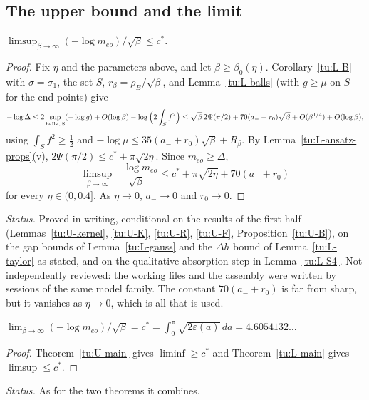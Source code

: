 \subsection{The upper bound and the limit}

\begin{theorem}\label{tu:L-main}
$\limsup_{\beta\to\infty}(-\log m_{eo})/\sqrt\beta\le c^*$.
\end{theorem}

\begin{proof}
Fix $\eta$ and the parameters above, and let $\beta\ge\beta_0(\eta)$. Corollary~\ref{tu:L-B} with $\sigma=\sigma_1$, the set $S$,
$r_\beta=\rho_B/\sqrt\beta$, and Lemma~\ref{tu:L-balls} (with $g\ge\mu$ on $S$ for the end points) give
\[
-\log\Delta\le2\sup_{\rm balls\cup S}(-\log g)+O(\log\beta)-\log\Big(2\int_Sf^2\Big)
\le\sqrt\beta\,2\Psi(\pi/2)+70(a_-+r_0)\sqrt\beta+O(\beta^{1/4})+O(\log\beta),
\]
using $\int_Sf^2\ge\frac12$ and $-\log\mu\le35(a_-+r_0)\sqrt\beta+R_\beta$. By Lemma~\ref{tu:L-ansatz-props}(v),
$2\Psi(\pi/2)\le c^*+\pi\sqrt{2\eta}$. Since $m_{eo}\ge\Delta$,
\[
\limsup_{\beta\to\infty}\frac{-\log m_{eo}}{\sqrt\beta}\le c^*+\pi\sqrt{2\eta}+70(a_-+r_0)
\]
for every $\eta\in(0,0.4]$. As $\eta\to0$, $a_-\to0$ and $r_0\to0$.
\end{proof}

\noindent\emph{Status.} Proved in writing, conditional on the results of the first half (Lemmas~\ref{tu:U-kernel},
\ref{tu:U-K}, \ref{tu:U-R}, \ref{tu:U-F}, Proposition~\ref{tu:U-B}), on the gap bounds of Lemma~\ref{tu:L-gauss} and the $\Delta h$
bound of Lemma~\ref{tu:L-taylor} as stated, and on the qualitative absorption step in Lemma~\ref{tu:L-S4}. Not independently
reviewed: the working files and the assembly were written by sessions of the same model family. The constant $70(a_-+r_0)$ is far
from sharp, but it vanishes as $\eta\to0$, which is all that is used.

\begin{corollary}\label{tu:L-limit}
$\lim_{\beta\to\infty}(-\log m_{eo})/\sqrt\beta=c^*=\int_0^\pi\sqrt{2\varepsilon(a)}\,da=4.6054132\ldots$
\end{corollary}

\begin{proof}
Theorem~\ref{tu:U-main} gives $\liminf\ge c^*$ and Theorem~\ref{tu:L-main} gives $\limsup\le c^*$.
\end{proof}

\noindent\emph{Status.} As for the two theorems it combines.
